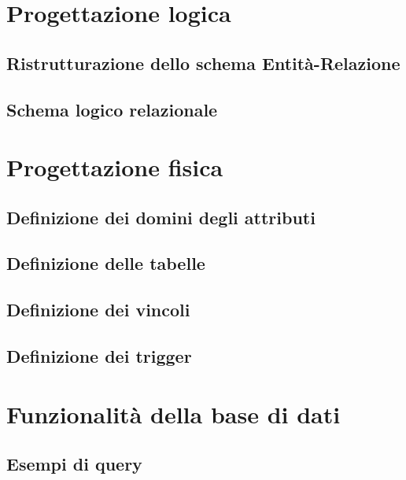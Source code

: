 \chapter{Progettazione logica}

\section{Ristrutturazione dello schema Entità-Relazione}

\section{Schema logico relazionale}

\chapter{Progettazione fisica}

\section{Definizione dei domini degli attributi}

\section{Definizione delle tabelle}

\section{Definizione dei vincoli}

\section{Definizione dei trigger}

\chapter{Funzionalità della base di dati}

\section{Esempi di query} %
